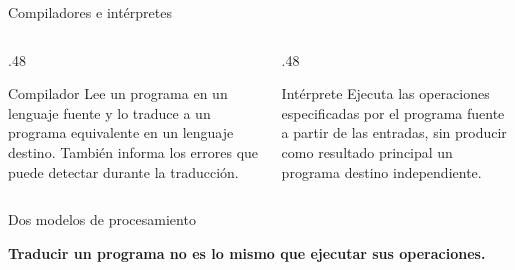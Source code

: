 \documentclass[11pt,spanish]{beamer}
\newcommand{\term}[1]{\textbf{\textcolor{indiagreen!80!black}{#1}}}
\begin{document}
\begin{frame}{Compiladores e intérpretes}
\vfill

\begin{columns}[T,onlytextwidth]
\begin{column}{.48\textwidth}
\begin{block}{Compilador}
\small
Lee un programa en un lenguaje fuente y lo traduce a un programa equivalente en un lenguaje destino. También informa los errores que puede detectar durante la traducción.
\end{block}
\end{column}
\begin{column}{.48\textwidth}
\begin{block}{Intérprete}
\small
Ejecuta las operaciones especificadas por el programa fuente a partir de las entradas, sin producir como resultado principal un programa destino independiente.
\end{block}
\end{column}
\end{columns}

\vfill
\end{frame}

\begin{frame}{Dos modelos de procesamiento}
\vfill

\begin{center}

\bigskip

\end{center}

\bigskip

\begin{center}
\term{Traducir un programa no es lo mismo que ejecutar sus operaciones.}
\end{center}

\vfill
\end{frame}
\end{document}
